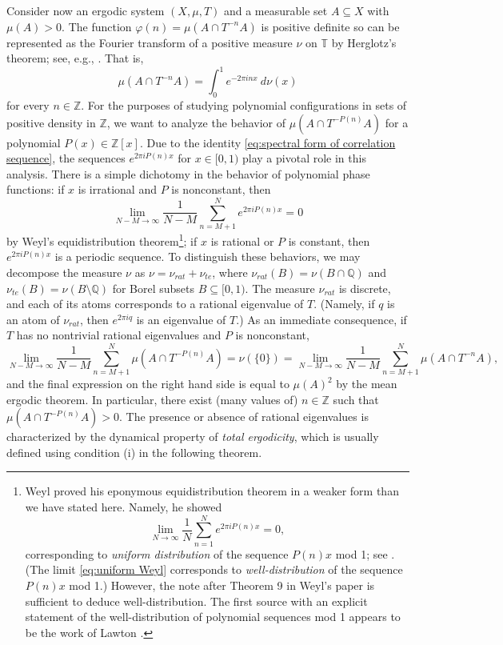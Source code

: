 \documentclass{amsart}
\theoremstyle{definition}
\numberwithin{equation}{section}
\newcommand{\Z}{\mathbb{Z}}
\newcommand{\Q}{\mathbb{Q}}
\newcommand{\T}{\mathbb{T}}
\begin{document}
Consider now an ergodic system $(X, \mu, T)$ and a measurable set $A \subseteq X$ with $\mu(A) > 0$.
The function $\varphi(n) = \mu(A \cap T^{-n}A)$ is positive definite so can be represented as the Fourier transform of a positive measure $\nu$ on $\T$ by Herglotz's theorem; see, e.g., \cite[Chapter 4]{nadkarni}.
That is,
\begin{equation} \label{eq:spectral form of correlation sequence}
    \mu(A \cap T^{-n}A) = \int_0^1 e^{-2\pi inx}~d\nu(x)
\end{equation}
for every $n \in \Z$.
For the purposes of studying polynomial configurations in sets of positive density in $\Z$, we want to analyze the behavior of $\mu(A \cap T^{-P(n)}A)$ for a polynomial $P(x) \in \Z[x]$.
Due to the identity \eqref{eq:spectral form of correlation sequence}, the sequences $e^{2\pi i P(n)x}$ for $x \in [0,1)$ play a pivotal role in this analysis.
There is a simple dichotomy in the behavior of polynomial phase functions: if $x$ is irrational and $P$ is nonconstant, then
\begin{equation} \label{eq:uniform Weyl}
    \lim_{N-M \to \infty} \frac{1}{N-M} \sum_{n=M+1}^N e^{2\pi i P(n)x} = 0
\end{equation}
by Weyl's equidistribution theorem\footnote{Weyl proved his eponymous equidistribution theorem in a weaker form than we have stated here.
Namely, he showed
\begin{equation*}
    \lim_{N \to \infty} \frac{1}{N} \sum_{n=1}^N e^{2\pi i P(n)x} = 0,
\end{equation*}
corresponding to \emph{uniform distribution} of the sequence $P(n)x$ mod 1; see \cite[Theorem 9]{weyl}.
(The limit \eqref{eq:uniform Weyl} corresponds to \emph{well-distribution} of the sequence $P(n)x$ mod 1.)
However, the note after Theorem 9 in Weyl's paper is sufficient to deduce well-distribution.
The first source with an explicit statement of the well-distribution of polynomial sequences mod 1 appears to be the work of Lawton \cite{lawton}.}; if $x$ is rational or $P$ is constant, then $e^{2\pi i P(n)x}$ is a periodic sequence.
To distinguish these behaviors, we may decompose the measure $\nu$ as $\nu = \nu_{rat} + \nu_{te}$, where $\nu_{rat}(B) = \nu(B \cap \Q)$ and $\nu_{te}(B) = \nu(B \setminus \Q)$ for Borel subsets $B \subseteq [0,1)$.
The measure $\nu_{rat}$ is discrete, and each of its atoms corresponds to a rational eigenvalue of $T$.
(Namely, if $q$ is an atom of $\nu_{rat}$, then $e^{2\pi i q}$ is an eigenvalue of $T$.)
As an immediate consequence, if $T$ has no nontrivial rational eigenvalues and $P$ is nonconstant,
\begin{equation*}
    \lim_{N-M \to \infty} \frac{1}{N-M} \sum_{n=M+1}^N \mu(A \cap T^{-P(n)}A) = \nu(\{0\}) = \lim_{N-M \to \infty} \frac{1}{N-M} \sum_{n=M+1}^N \mu(A \cap T^{-n}A),
\end{equation*}
and the final expression on the right hand side is equal to $\mu(A)^2$ by the mean ergodic theorem.
In particular, there exist (many values of) $n \in \Z$ such that $\mu(A \cap T^{-P(n)}A) > 0$.
The presence or absence of rational eigenvalues is characterized by the dynamical property of \emph{total ergodicity}, which is usually defined using condition (i) in the following theorem.
\end{document}
